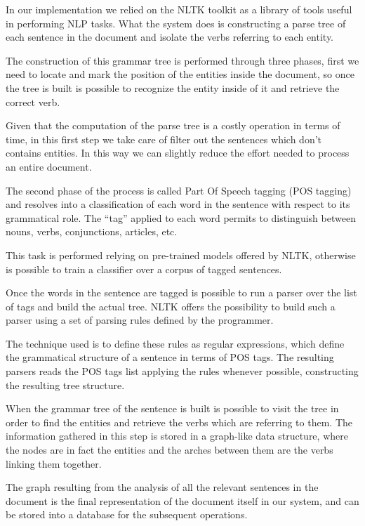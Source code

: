 \documentclass{acm_proc_article-sp-sigmod07}
\begin{document}
In our implementation we relied on the NLTK toolkit as a library of tools
useful in performing NLP tasks. What the system does is constructing a
parse tree of each sentence in the document and isolate the verbs
referring to each entity.

The construction of this grammar tree is performed through three phases,
first we need to locate and mark the position of the entities inside the
document, so once the tree is built is possible to recognize the entity
inside of it and retrieve the correct verb.

Given that the computation of the parse tree is a costly operation in
terms of time, in this first step we take care of filter out the sentences
which don't contains entities. In this way we can slightly reduce the
effort needed to process an entire document.

The second phase of the process is called Part Of Speech tagging (POS
tagging) and resolves into a classification of each word in the sentence
with respect to its grammatical role.
The ``tag'' applied to each word permits to distinguish between nouns,
verbs, conjunctions, articles, etc.

This task is performed relying on pre-trained models offered by NLTK,
otherwise is possible to train a classifier over a corpus of tagged
sentences.

Once the words in the sentence are tagged is possible to run a parser over
the list of tags and build the actual tree. NLTK offers the possibility to
build such a parser using a set of parsing rules defined by the
programmer. 

The technique used is to define these rules as regular expressions, which
define the grammatical structure of a sentence in terms of POS tags.
The resulting parsers reads the POS tags list applying the rules whenever
possible, constructing the resulting tree structure.

When the grammar tree of the sentence is built is possible to visit the
tree in order to find the entities and retrieve the verbs which are
referring to them. 
The information gathered in this step is stored in a graph-like data
structure, where the nodes are in fact the entities and the arches between
them are the verbs linking them together.

The graph resulting from the analysis of all the relevant sentences in the
document is the final representation of the document itself in our system,
and can be stored into a database for the subsequent operations.
\end{document}
